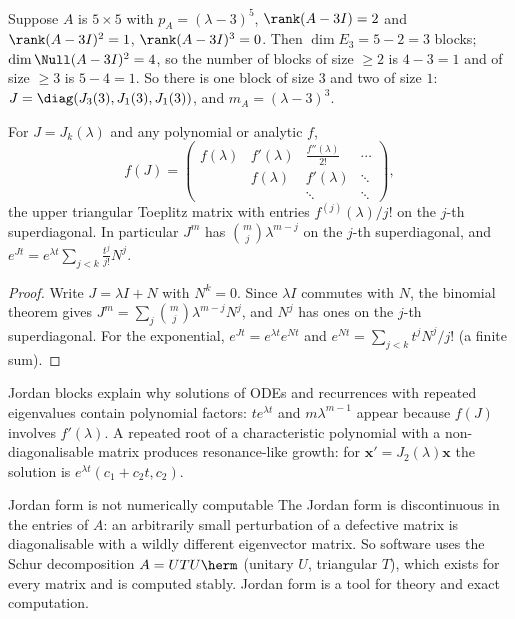 \begin{example}\label{ex:jordan}
Suppose $A$ is $5\times5$ with $p_A=(\lambda-3)^5$, $\rank(A-3I)=2$ and $\rank(A-3I)^2=1$, $\rank(A-3I)^3=0$. Then $\dim E_3=5-2=3$ blocks; $\dim\Null(A-3I)^2=4$, so the number of blocks of size $\ge2$ is $4-3=1$ and of size $\ge3$ is $5-4=1$. So there is one block of size $3$ and two of size $1$: $J=\diag(J_3(3),J_1(3),J_1(3))$, and $m_A=(\lambda-3)^3$.
\end{example}

\begin{theorem}\label{thm:jordanpow}
For $J=J_k(\lambda)$ and any polynomial or analytic $f$,
\[ f(J)=\begin{pmatrix}f(\lambda)&f'(\lambda)&\frac{f''(\lambda)}{2!}&\cdots\\&f(\lambda)&f'(\lambda)&\ddots\\&&\ddots&\ddots\end{pmatrix}, \]
the upper triangular Toeplitz matrix with entries $f^{(j)}(\lambda)/j!$ on the $j$-th superdiagonal. In particular $J^m$ has $\binom{m}{j}\lambda^{m-j}$ on the $j$-th superdiagonal, and $e^{Jt}=e^{\lambda t}\sum_{j<k}\frac{t^j}{j!}N^j$.
\end{theorem}

\begin{proof}
Write $J=\lambda I+N$ with $N^k=0$. Since $\lambda I$ commutes with $N$, the binomial theorem gives $J^m=\sum_j\binom mj\lambda^{m-j}N^j$, and $N^j$ has ones on the $j$-th superdiagonal. For the exponential, $e^{Jt}=e^{\lambda t}e^{Nt}$ and $e^{Nt}=\sum_{j<k}t^jN^j/j!$ (a finite sum).
\end{proof}

\begin{intuition}
Jordan blocks explain why solutions of ODEs and recurrences with repeated eigenvalues contain polynomial factors: $te^{\lambda t}$ and $m\lambda^{m-1}$ appear because $f(J)$ involves $f'(\lambda)$. A repeated root of a characteristic polynomial with a non-diagonalisable matrix produces resonance-like growth: for $\mathbf{x}'=J_2(\lambda)\mathbf{x}$ the solution is $e^{\lambda t}(c_1+c_2t,c_2)$.
\end{intuition}

\begin{nuance}{Jordan form is not numerically computable}
The Jordan form is discontinuous in the entries of $A$: an arbitrarily small perturbation of a defective matrix is diagonalisable with a wildly different eigenvector matrix. So software uses the Schur decomposition $A=UTU\herm$ (unitary $U$, triangular $T$), which exists for every matrix and is computed stably. Jordan form is a tool for theory and exact computation.
\end{nuance}


